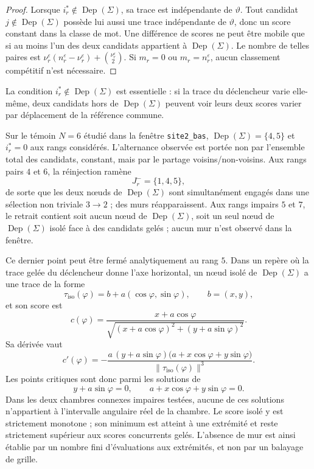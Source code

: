 \documentclass[11pt,a4paper]{article}
\theoremstyle{definition}
\theoremstyle{remark}
\begin{document}
\begin{proof}
Lorsque $i_r^*\notin\operatorname{Dep}(\Sigma)$, sa trace est indépendante de $\vartheta$. Tout candidat $j\notin\operatorname{Dep}(\Sigma)$ possède lui aussi une trace indépendante de $\vartheta$, donc un score constant dans la classe de mot. Une différence de scores ne peut être mobile que si au moins l'un des deux candidats appartient à $\operatorname{Dep}(\Sigma)$. Le nombre de telles paires est $\nu_r^\varepsilon(n_r^\varepsilon-\nu_r^\varepsilon)+\binom{\nu_r^\varepsilon}{2}$. Si $m_r=0$ ou $m_r=n_r^\varepsilon$, aucun classement compétitif n'est nécessaire.
\end{proof}

La condition $i_r^*\notin\operatorname{Dep}(\Sigma)$ est essentielle : si la trace du déclencheur varie elle-même, deux candidats hors de $\operatorname{Dep}(\Sigma)$ peuvent voir leurs deux scores varier par déplacement de la référence commune.

Sur le témoin $N=6$ étudié dans la fenêtre \texttt{site2\_bas}, $\operatorname{Dep}(\Sigma)=\{4,5\}$ et $i_r^*=0$ aux rangs considérés. L'alternance observée est portée non par l'ensemble total des candidats, constant, mais par le partage voisins/non-voisins. Aux rangs pairs $4$ et $6$, la réinjection ramène
\[
 J_r^-=\{1,4,5\},
\]
de sorte que les deux nœuds de $\operatorname{Dep}(\Sigma)$ sont simultanément engagés dans une sélection non triviale $3\to2$ ; des murs réapparaissent. Aux rangs impairs $5$ et $7$, le retrait contient soit aucun nœud de $\operatorname{Dep}(\Sigma)$, soit un seul nœud de $\operatorname{Dep}(\Sigma)$ isolé face à des candidats gelés ; aucun mur n'est observé dans la fenêtre.

Ce dernier point peut être fermé analytiquement au rang $5$. Dans un repère où la trace gelée du déclencheur donne l'axe horizontal, un nœud isolé de $\operatorname{Dep}(\Sigma)$ a une trace de la forme
\[
 \tau_{\mathrm{iso}}(\varphi)=b+a(\cos\varphi,\sin\varphi),
 \qquad b=(x,y),
\]
et son score est
\[
 c(\varphi)
 =\frac{x+a\cos\varphi}
 {\sqrt{(x+a\cos\varphi)^2+(y+a\sin\varphi)^2}}.
\]
Sa dérivée vaut
\[
 \boxed{
 c'(\varphi)
 =-\frac{a\,(y+a\sin\varphi)
 \bigl(a+x\cos\varphi+y\sin\varphi\bigr)}
 {\|\tau_{\mathrm{iso}}(\varphi)\|^3}.}
\]
Les points critiques sont donc parmi les solutions de
\[
 y+a\sin\varphi=0,
 \qquad
 a+x\cos\varphi+y\sin\varphi=0.
\]
Dans les deux chambres connexes impaires testées, aucune de ces solutions n'appartient à l'intervalle angulaire réel de la chambre. Le score isolé y est strictement monotone ; son minimum est atteint à une extrémité et reste strictement supérieur aux scores concurrents gelés. L'absence de mur est ainsi établie par un nombre fini d'évaluations aux extrémités, et non par un balayage de grille.
\end{document}
